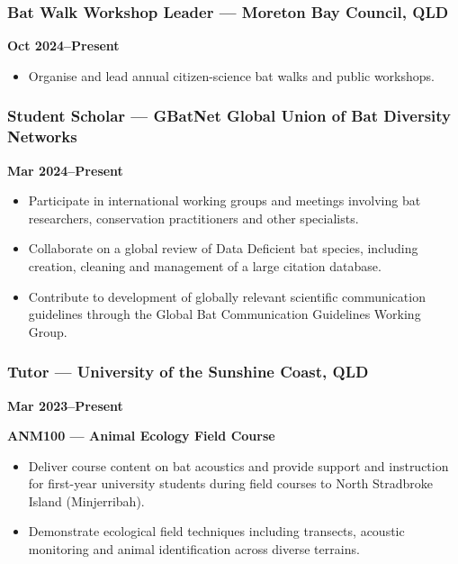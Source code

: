 \documentclass[
]{article}
\providecommand{\tightlist}{%
  \setlength{\itemsep}{0pt}\setlength{\parskip}{0pt}}
\begin{document}
\subsubsection{Bat Walk Workshop Leader --- Moreton Bay Council,
QLD}\label{bat-walk-workshop-leader-moreton-bay-council-qld}

\textbf{Oct 2024--Present}

\begin{itemize}
\tightlist
\item
  Organise and lead annual citizen-science bat walks and public
  workshops.
\end{itemize}

\subsubsection{Student Scholar --- GBatNet Global Union of Bat Diversity
Networks}\label{student-scholar-gbatnet-global-union-of-bat-diversity-networks}

\textbf{Mar 2024--Present}

\begin{itemize}
\tightlist
\item
  Participate in international working groups and meetings involving bat
  researchers, conservation practitioners and other specialists.
\item
  Collaborate on a global review of Data Deficient bat species,
  including creation, cleaning and management of a large citation
  database.
\item
  Contribute to development of globally relevant scientific
  communication guidelines through the Global Bat Communication
  Guidelines Working Group.
\end{itemize}

\subsubsection{Tutor --- University of the Sunshine Coast,
QLD}\label{tutor-university-of-the-sunshine-coast-qld}

\textbf{Mar 2023--Present}

\textbf{ANM100 --- Animal Ecology Field Course}

\begin{itemize}
\tightlist
\item
  Deliver course content on bat acoustics and provide support and
  instruction for first-year university students during field courses to
  North Stradbroke Island (Minjerribah).
\item
  Demonstrate ecological field techniques including transects, acoustic
  monitoring and animal identification across diverse terrains.
\end{itemize}
\end{document}
